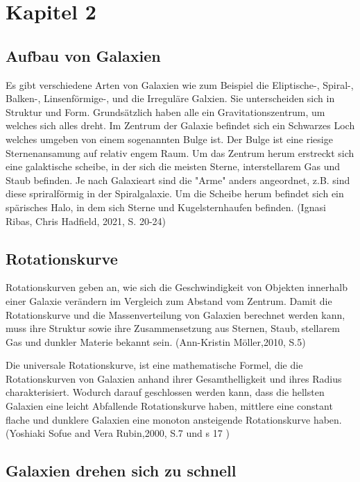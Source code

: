
\section{Kapitel 2}

\subsection{Aufbau von Galaxien}

Es gibt verschiedene Arten von Galaxien wie zum Beispiel die Eliptische-, Spiral-, Balken-, Linsenförmige-, 
und die Irreguläre Galxien. Sie unterscheiden sich in Struktur und Form. Grundsätzlich haben alle ein 
Gravitationszentrum, um welches sich alles dreht. Im Zentrum der Galaxie befindet sich ein Schwarzes 
Loch welches umgeben von einem sogenannten Bulge ist. Der Bulge ist eine riesige Sternenansamung auf relativ engem Raum. Um das 
Zentrum herum erstreckt sich eine galaktische scheibe, in der sich die meisten Sterne, interstellarem Gas und Staub befinden. 
Je nach Galaxieart sind die "Arme" anders angeordnet, z.B. sind diese spriralförmig in der Spiralgalaxie. Um die Scheibe herum befindet 
sich ein spärisches Halo, in dem sich Sterne und Kugelsternhaufen befinden. 
(Ignasi Ribas, Chris Hadfield, 2021, S. 20-24)

\subsection{Rotationskurve}

Rotationskurven geben an, wie sich die Geschwindigkeit von Objekten innerhalb einer Galaxie verändern im Vergleich zum Abstand vom Zentrum. 
Damit die Rotationskurve und die Massenverteilung von Galaxien berechnet werden kann, muss ihre Struktur sowie ihre Zusammensetzung 
aus Sternen, Staub, stellarem Gas und dunkler Materie bekannt sein. (Ann-Kristin Möller,2010, S.5) 

Die universale Rotationskurve, ist eine mathematische Formel, die die Rotationskurven von Galaxien anhand ihrer Gesamthelligkeit und ihres Radius charakterisiert.
Wodurch darauf geschlossen werden kann, dass die hellsten Galaxien eine leicht Abfallende Rotationskurve haben, mittlere eine constant flache und dunklere 
Galaxien eine monoton ansteigende Rotationskurve haben. (Yoshiaki Sofue and Vera Rubin,2000, S.7 und s 17 )

\subsection{Galaxien drehen sich zu schnell}

